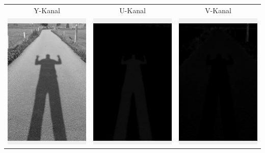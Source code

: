 \documentclass[12pt]{article}
\begin{document}
\begin{tabular}{c | c | c}
  Y-Kanal & U-Kanal & V-Kanal \\
  \includegraphics[width=.3\linewidth]{y.png} & \includegraphics[width=.3\linewidth]{u.png} & \includegraphics[width=.3\linewidth]{v.png}
\end{tabular}
\end{document}
